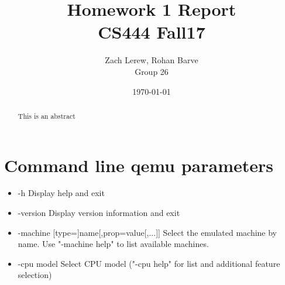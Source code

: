 \documentclass[letterpaper,10pt,fleqn]{article}
\title{Homework 1 Report\\\large CS444 Fall17}
\author{Zach Lerew, Rohan Barve\\\large Group 26}
\date{\today}
\begin{document}
	\begin{titlingpage}
		\maketitle
		\begin{abstract}
			This is an abstract
		\end{abstract}
	\end{titlingpage}


	\section*{Command line qemu parameters}
	\begin{itemize}
		\item-h Display help and exit
		\item-version Display version information and exit
		\item-machine [type=]name[,prop=value[,...]]
					 Select the emulated machine by name. Use "-machine help" to list
           available machines.
		\item-cpu model
           Select CPU model ("-cpu help" for list and additional feature
           selection)


\end{itemize}
\end{document}
